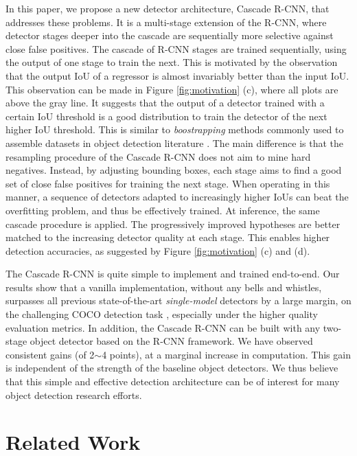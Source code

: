 \documentclass[10pt,twocolumn,letterpaper]{article}
\begin{document}
In this paper, we propose a new detector architecture, Cascade R-CNN,
that addresses these problems. It is a multi-stage extension of the
R-CNN, where detector stages deeper into the cascade are sequentially more
selective against close false positives. The cascade of R-CNN stages are
trained sequentially, using the output of one stage to train the next. This
is motivated by the observation that the output IoU of a regressor is
almost invariably better than the input IoU. This observation can be made
in Figure \ref{fig:motivation} (c), where all plots are above the gray
line. It suggests that the output of a detector trained with a certain
IoU threshold is a good distribution to train the detector of the next
higher IoU threshold. This is similar to {\it boostrapping\/} methods
commonly used to assemble datasets in object detection
literature \cite{DBLP:journals/ijcv/ViolaJ04,DBLP:journals/pami/FelzenszwalbGMR10}. The main difference is that the resampling procedure of the
Cascade R-CNN does not aim to mine hard negatives. Instead, by adjusting
bounding boxes, each stage aims to find a good set of close false positives
for training the next stage. When operating in this manner, a sequence of
detectors adapted to increasingly higher IoUs can beat the overfitting
problem, and thus be effectively trained. At inference, the same cascade
procedure is applied. The progressively improved hypotheses are better
matched to the increasing detector quality at each stage. This enables
higher detection accuracies, as suggested by Figure \ref{fig:motivation} (c)
and (d).

The Cascade R-CNN is quite simple to implement and trained end-to-end.
Our results show that a vanilla implementation, without any bells and whistles,
surpasses all previous state-of-the-art \emph{single-model} detectors by a
large margin, on the challenging COCO detection
task \cite{DBLP:conf/eccv/LinMBHPRDZ14}, especially under the higher quality
evaluation metrics. In addition, the Cascade R-CNN can be built with any
two-stage object detector based on the R-CNN framework. We have
observed consistent gains (of 2$\sim$4 points), at a marginal increase in
computation. This gain is independent of the strength of the baseline object
detectors. We thus believe that this simple and effective detection
architecture can be of interest for many object detection research efforts.


\section{Related Work}
\end{document}
